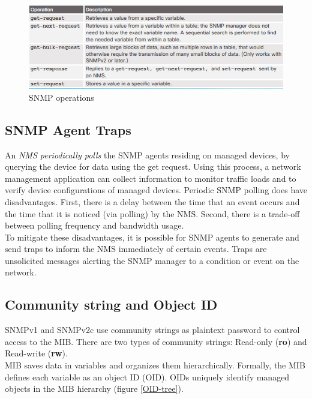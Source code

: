 \begin{figure}[hbtp]
\caption{SNMP operations}\label{SNMPoperation}
\centering
\includegraphics[scale=1]{pictures/SNMPoperation.PNG}
\end{figure}

\subsection{SNMP Agent Traps}

An \emph{NMS periodically polls} the SNMP agents residing on managed devices, by querying the device for data using the get request. Using this process, a network management application can collect information to monitor traffic loads and to verify device configurations of managed devices. Periodic SNMP polling does have disadvantages. First, there is a delay between the time that an event occurs and the time that it is noticed (via polling) by the NMS. Second, there is a trade-off between polling frequency and bandwidth usage.\\

To mitigate these disadvantages, it is possible for SNMP agents to generate and send traps to inform the NMS immediately of certain events. Traps are unsolicited messages alerting the SNMP manager to a condition or event on the network. 

\subsection{Community string and Object ID}

SNMPv1 and SNMPv2c use community strings as plaintext password to control access to the MIB. There are two types of community strings: Read-only (\textbf{ro}) and Read-write (\textbf{rw}).\\

MIB saves data in variables and organizes them hierarchically. Formally, the MIB defines each variable as an object ID (OID). OIDs uniquely identify managed objects in the MIB hierarchy (figure \ref{OID-tree}).

